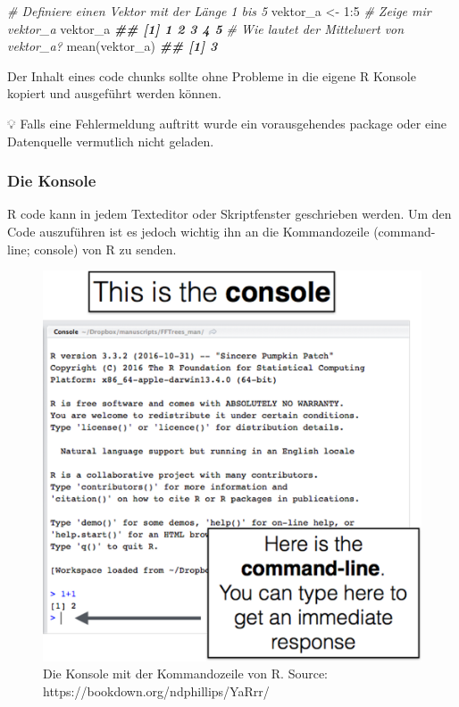 \documentclass[
]{article}
\newenvironment{Shaded}{\begin{snugshade}}{\end{snugshade}}
\newcommand{\CommentTok}[1]{\textcolor[rgb]{0.56,0.35,0.01}{\textit{#1}}}
\newcommand{\DecValTok}[1]{\textcolor[rgb]{0.00,0.00,0.81}{#1}}
\newcommand{\DocumentationTok}[1]{\textcolor[rgb]{0.56,0.35,0.01}{\textbf{\textit{#1}}}}
\newcommand{\FunctionTok}[1]{\textcolor[rgb]{0.00,0.00,0.00}{#1}}
\newcommand{\NormalTok}[1]{#1}
\newcommand{\OtherTok}[1]{\textcolor[rgb]{0.56,0.35,0.01}{#1}}
\newcommand{\SpecialCharTok}[1]{\textcolor[rgb]{0.00,0.00,0.00}{#1}}
\begin{document}
\begin{Shaded}
\begin{Highlighting}[]
\CommentTok{\# Definiere einen Vektor mit der Länge 1 bis 5 }
\NormalTok{vektor\_a }\OtherTok{\textless{}{-}} \DecValTok{1}\SpecialCharTok{:}\DecValTok{5}
\CommentTok{\# Zeige mir vektor\_a}
\NormalTok{vektor\_a}
\DocumentationTok{\#\# [1] 1 2 3 4 5}
\CommentTok{\# Wie lautet der Mittelwert von vektor\_a?}
\FunctionTok{mean}\NormalTok{(vektor\_a)}
\DocumentationTok{\#\# [1] 3}
\end{Highlighting}
\end{Shaded}

Der Inhalt eines code chunks sollte ohne Probleme in die eigene R Konsole kopiert und ausgeführt werden können.

💡 Falls eine Fehlermeldung auftritt wurde ein vorausgehendes package oder eine Datenquelle vermutlich nicht geladen.

\hypertarget{die-konsole}{%
\subsubsection{Die Konsole}\label{die-konsole}}

R code kann in jedem Texteditor oder Skriptfenster geschrieben werden. Um den Code auszuführen ist es jedoch wichtig ihn an die Kommandozeile (command-line; console) von R zu senden.

\begin{figure}

{\centering \includegraphics[width=1\linewidth]{images/013} 

}

\caption{Die Konsole mit der Kommandozeile von R. Source: https://bookdown.org/ndphillips/YaRrr/}\label{fig:unnamed-chunk-21}
\end{figure}
\end{document}

